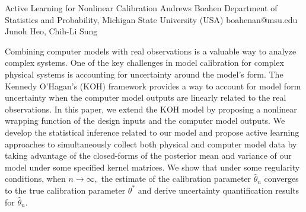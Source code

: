 \begin{talk}
  {Active Learning for Nonlinear Calibration}%
  {Andrews Boahen}%
  {Department of Statistics and Probability, Michigan State University (USA)}%
  {boahenan@msu.edu}%
  {Junoh Heo, Chih-Li Sung}%
  
    
   
Combining computer models with real observations is a valuable way to analyze complex systems. One of the key challenges in model calibration for complex physical systems is accounting for uncertainty around the model's form. The Kennedy O'Hagan's (KOH) framework provides a way to account for model form uncertainty when the computer model outputs are linearly related to the real observations. In this paper, we extend the KOH model by proposing a nonlinear wrapping function of the design inputs and the computer model outputs. We develop the statistical inference related to our model and propose active learning approaches to simultaneously collect both physical and computer model data by taking advantage of the closed-forms of the posterior mean and variance of our model under some specified kernel matrices. We show that under some regularity conditions, when $n\rightarrow\infty,$ the estimate of the calibration parameter $\hat{\theta}_n$ converges  to  the true calibration parameter $\theta^*$ and derive uncertainty quantification results for $\hat{\theta}_n.$
\medskip


\end{talk}

